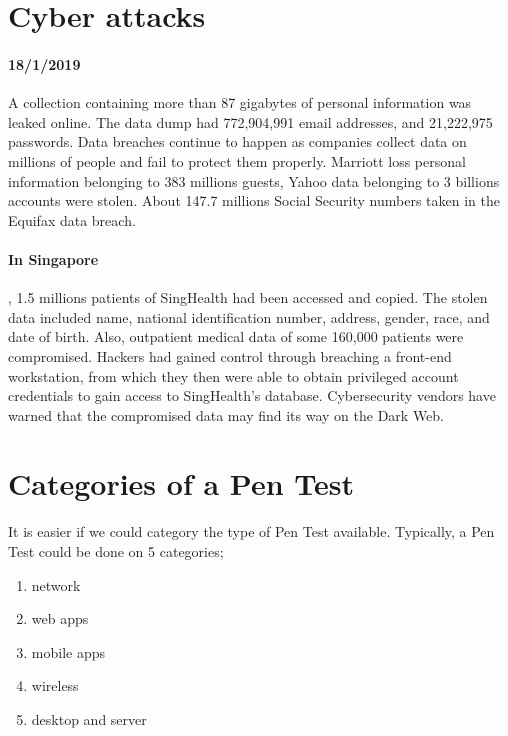 \documentclass[7x9]{times}
\begin{document}
\section{Cyber attacks}

\paragraph{18/1/2019} A collection containing more than 87 gigabytes of 
personal information was leaked online. The data dump had 772,904,991 email 
addresses, and 21,222,975 passwords. Data breaches continue to happen as 
companies collect data on millions of people and fail to protect them properly. 
Marriott loss personal information belonging to 383 millions guests, Yahoo data 
belonging to 3 billions accounts were stolen. About 147.7 millions Social 
Security numbers taken in the Equifax data breach.

\paragraph{In Singapore}, 1.5 millions patients of SingHealth had been accessed 
and copied. The stolen data included name, national identification number, 
address, gender, race, and date of birth. Also, outpatient medical data of some 
160,000 patients were compromised. Hackers had gained control through 
breaching a front-end workstation, from which they then were able to obtain 
privileged account credentials to gain access to SingHealth's database. 
Cybersecurity vendors have warned that the compromised data may find its way on 
the Dark Web.



\section{Categories of a Pen Test}

It is easier if we could category the type of Pen Test available. Typically, 
a Pen Test could be done on 5 categories;
\begin{enumerate}
    \item network
    \item web apps
    \item mobile apps
    \item wireless
    \item desktop and server
\end{enumerate}
\end{document}
